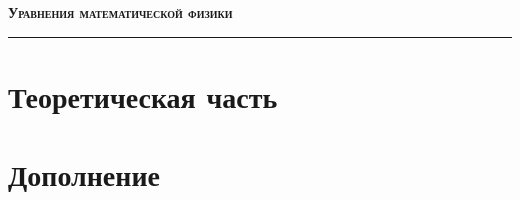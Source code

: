 \documentclass[12pt]{article}
\theoremstyle{plain}
\begin{document}
	
	\begin{center}
		\LARGE \bf	
		\textsc{Уравнения математической физики}
		\rule{\textwidth}{0.4pt}
	\end{center}
	
	\section{Теоретическая часть}
	
	 \newpage
	 \newpage
	 \newpage
	 \newpage
	 \newpage
	 \newpage
	 \newpage
	 \newpage
	 \newpage
	 \newpage
	 \newpage
	 \newpage
	 \newpage
	 \newpage
	 \newpage
	 \newpage
	 \newpage
	 \newpage
	 \newpage
	 \newpage
	 \newpage
	 \newpage
	 \newpage
	 \newpage
	 \newpage
	 \newpage
	 \newpage
	 \newpage
	 \newpage
	 \newpage
	 \newpage
	 \newpage
	 \newpage
	
	\section{Дополнение}
	
	 \newpage
	
\end{document}
